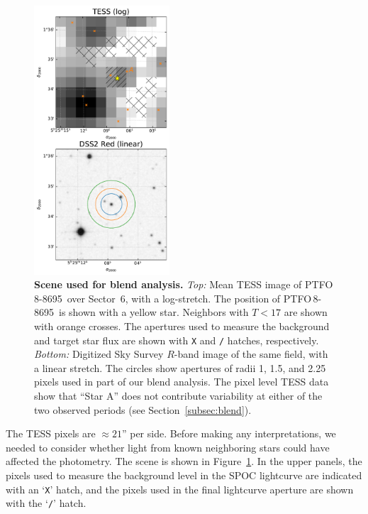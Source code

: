 \documentclass[12pt,twocolumn,tighten]{aastex62}
\newcommand{\ptfo}{PTFO$\,$8-8695}
\begin{document}
\begin{figure}[t]
	\begin{center}
		\leavevmode
		\includegraphics[width=0.45\textwidth]{f4.pdf}
	\end{center}
	\vspace{-0.7cm}
	\caption{ {\bf Scene used for blend analysis.}
		{\it Top:} Mean TESS image of \ptfo\ over Sector~6, with a
		log-stretch.  The position of \ptfo\ is shown with a yellow
		star.  Neighbors with $T<17$ are shown with orange crosses.  The
		apertures used to measure the background and target star flux are
		shown with \texttt{X} and \texttt{/} hatches, respectively.
		{\it Bottom:} Digitized Sky Survey $R$-band image of the same
		field, with a linear stretch. The circles show apertures of radii
		1, 1.5, and 2.25 pixels used in part of our blend analysis.  The
		pixel level TESS data show that ``Star A''  does not contribute
		variability at either of the two observed periods (see
		Section~\ref{subsec:blend}).
		\label{fig:scene}
	}
\end{figure}


The TESS pixels are $\approx21$'' per side. Before making any
interpretations, we needed to consider whether light from known
neighboring stars could have affected the photometry.  The scene is
shown in Figure~\ref{fig:scene}.  In the upper panels, the pixels used
to measure the background level in the SPOC lightcurve are indicated
with an `\texttt{X}' hatch, and the pixels used in the final
lightcurve aperture are shown with the `\texttt{/}' hatch.
\end{document}
